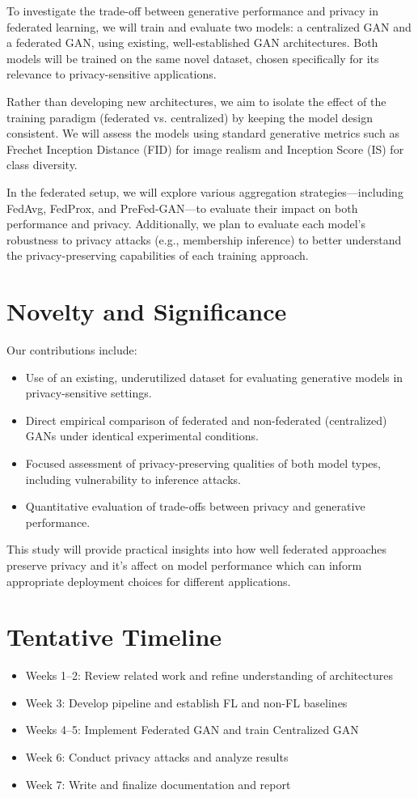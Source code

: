 \documentclass{article}
\begin{document}
To investigate the trade-off between generative performance and privacy in federated learning, we will train and evaluate two models: a centralized GAN and a federated GAN, using existing, well-established GAN architectures. Both models will be trained on the same novel dataset, chosen specifically for its relevance to privacy-sensitive applications.

Rather than developing new architectures, we aim to isolate the effect of the training paradigm (federated vs. centralized) by keeping the model design consistent. We will assess the models using standard generative metrics such as Frechet Inception Distance (FID) for image realism and Inception Score (IS) for class diversity.

In the federated setup, we will explore various aggregation strategies—including FedAvg, FedProx, and PreFed-GAN—to evaluate their impact on both performance and privacy. Additionally, we plan to evaluate each model’s robustness to privacy attacks (e.g., membership inference) to better understand the privacy-preserving capabilities of each training approach.
\section{Novelty and Significance}
Our contributions include:
\begin{itemize}
  \item Use of an existing, underutilized dataset for evaluating generative models in privacy-sensitive settings.
  \item Direct empirical comparison of federated and non-federated (centralized) GANs under identical experimental conditions.
  \item Focused assessment of privacy-preserving qualities of both model types, including vulnerability to inference attacks.
  \item Quantitative evaluation of trade-offs between privacy and generative performance.
\end{itemize}
This study will provide practical insights into how well federated approaches preserve privacy and it's affect on model performance which can inform appropriate deployment choices for different applications.

\section{Tentative Timeline}

\begin{itemize}
    \item Weeks 1–2: Review related work and refine understanding of architectures
    \item Week 3: Develop pipeline and establish FL and non-FL baselines
    \item Weeks 4–5: Implement Federated GAN and train Centralized GAN
    \item Week 6: Conduct privacy attacks and analyze results
    \item Week 7: Write and finalize documentation and report
\end{itemize}
\end{document}
